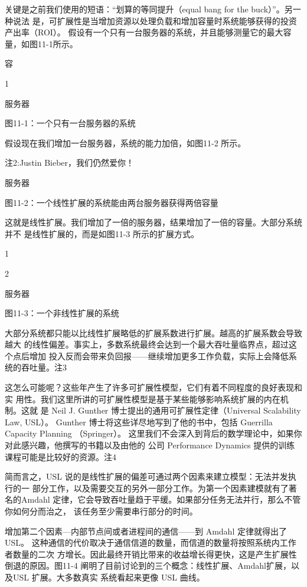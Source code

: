 关键是之前我们使用的短语：“划算的等同提升（equal bang for the buck）”。另一种说法
是，可扩展性是当增加资源以处理负载和增加容量时系统能够获得的投资产出率（ROI）。
假设有一个只有一台服务器的系统，并且能够测量它的最大容量，如图11-1所示。

容

1

服务器

图11-1：一个只有一台服务器的系统

假设现在我们增加一台服务器，系统的能力加倍，如图11-2 所示。

注2:Justin Bieber，我们仍然爱你！

服务器

图11-2：一个线性扩展的系统能由两台服务器获得两倍容量

这就是线性扩展。我们增加了一倍的服务器，结果增加了一倍的容量。大部分系统并不
是线性扩展的，而是如图11-3 所示的扩展方式。

1

2

服务器

图11-3：一个非线性扩展的系统

大部分系统都只能以比线性扩展略低的扩展系数进行扩展。越高的扩展系数会导致越大
的线性偏差。事实上，多数系统最终会达到一个最大吞吐量临界点，超过这个点后增加
投入反而会带来负回报——继续增加更多工作负载，实际上会降低系统的吞吐量。注3

这怎么可能呢？这些年产生了许多可扩展性模型，它们有着不同程度的良好表现和实
用性。我们这里所讲的可扩展性模型是基于某些能够影响系统扩展的内在机制。这就
是 Neil J. Gunther 博士提出的通用可扩展性定律（Universal Scalability Law, USL）。
Gunther 博士将这些详尽地写到了他的书中，包括 Guerrilla Capacity Planning （Springer）。
这里我们不会深入到背后的数学理论中，如果你对此感兴趣，他撰写的书籍以及由他的
公司 Performance Dynamics 提供的训练课程可能是比较好的资源。注4

简而言之，USL 说的是线性扩展的偏差可通过两个因素来建立模型：无法并发执行的一
部分工作，以及需要交互的另外一部分工作。为第一个因素建模就有了著名的Amdahl
定律，它会导致吞吐量趋于平缓。如果部分任务无法并行，那么不管你如何分而治之，
该任务至少需要串行部分的时间。

增加第二个因素—内部节点间或者进程间的通信——到 Amdahl 定律就得出了 USL。
这种通信的代价取决于通信信道的数量，而信道的数量将按照系统内工作者数量的二次
方增长。因此最终开销比带来的收益增长得更快，这是产生扩展性倒退的原因。图11-4
阐明了目前讨论到的三个概念：线性扩展、Amdahl扩展，以及USL 扩展。大多数真实
系统看起来更像 USL 曲线。

